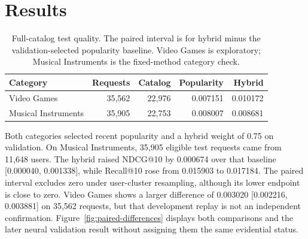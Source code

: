 \documentclass[11pt]{article}
\begin{document}
\section{Results}
\begin{table}[ht]
\centering
\caption{Full-catalog test quality. The paired interval is for hybrid minus the validation-selected popularity baseline. Video Games is exploratory; Musical Instruments is the fixed-method category check.}
\label{tab:quality}
\small
\begin{tabular}{@{}lrrrr@{}}
\toprule
Category & Requests & Catalog & Popularity & Hybrid \\
\midrule
Video Games & 35,562 & 22,976 & 0.007151 & 0.010172 \\
Musical Instruments & 35,905 & 22,753 & 0.008007 & 0.008681 \\
\bottomrule
\end{tabular}
\end{table}

Both categories selected recent popularity and a hybrid weight of 0.75 on validation. On Musical Instruments, 35,905 eligible test requests came from 11,648 users. The hybrid raised NDCG@10 by 0.000674 over that baseline [0.000040, 0.001338], while Recall@10 rose from 0.015903 to 0.017184. The paired interval excludes zero under user-cluster resampling, although its lower endpoint is close to zero. Video Games shows a larger difference of 0.003020 [0.002216, 0.003881] on 35,562 requests, but that development replay is not an independent confirmation. Figure~\ref{fig:paired-differences} displays both comparisons and the later neural validation result without assigning them the same evidential status.
\end{document}

